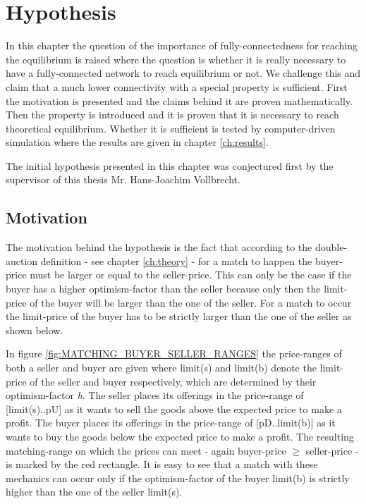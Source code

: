 \documentclass[Bachelorarbeit.tex]{subfiles}
\begin{document}
\graphicspath{{./figures/hypothesis/}}	%

\chapter{Hypothesis}
\label{ch:hypothesis}

In this chapter the question of the importance of fully-connectedness for reaching the equilibrium is raised where the question is whether it is really necessary to have a fully-connected network to reach equilibrium or not. We challenge this and claim that a much lower connectivity with a special property is sufficient. First the motivation is presented and the claims behind it are proven mathematically. Then the property is introduced and it is proven that it is necessary to reach theoretical equilibrium. Whether it is sufficient is tested by computer-driven simulation where the results are given in chapter \ref{ch:results}.

\medskip

The initial hypothesis presented in this chapter was conjectured first by the supervisor of this thesis Mr. Hans-Joachim Vollbrecht.

\section{Motivation}
The motivation behind the hypothesis is the fact that according to the double-auction definition - see chapter \ref{ch:theory} - for a match to happen the buyer-price must be larger or equal to the seller-price. This can only be the case if the buyer has a higher optimism-factor than the seller because only then the limit-price of the buyer will be larger than the one of the seller. For a match to occur the limit-price of the buyer has to be strictly larger than the one of the seller as shown below.

\medskip

In figure \ref{fig:MATCHING_BUYER_SELLER_RANGES} the price-ranges of both a seller and buyer are given where limit(s) and limit(b) denote the limit-price of the seller and buyer respectively, which are determined by their optimism-factor \textit{h}. The seller places its offerings in the price-range of [limit(s)..pU] as it wants to sell the goods above the expected price to make a profit. The buyer places its offerings in the price-range of [pD..limit(b)] as it wants to buy the goods below the expected price to make a profit. The resulting matching-range on which the prices can meet - again buyer-price $\geq$ seller-price - is marked by the red rectangle. It is easy to see that a match with these mechanics can occur only if the optimism-factor of the buyer limit(b) is strictly higher than the one of the seller limit(s).
\end{document}
